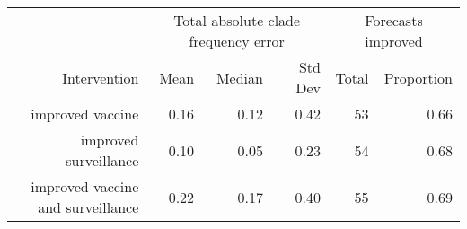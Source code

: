 
\begin{tabular*}{1.0\textwidth}{rrrrrr}
\toprule
             & \multicolumn{3}{c}{Total absolute clade frequency error} & \multicolumn{2}{c}{Forecasts improved} \\
Intervention & Mean & Median & Std Dev & Total & Proportion \\
\midrule

improved vaccine & 0.16 & 0.12 & 0.42 & 53 & 0.66 \\
improved surveillance & 0.10 & 0.05 & 0.23 & 54 & 0.68 \\
improved vaccine and surveillance & 0.22 & 0.17 & 0.40 & 55 & 0.69 \\

\bottomrule
\end{tabular*}

